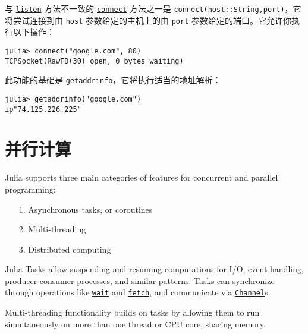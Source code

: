 与 \hyperlink{780704944207038170}{\texttt{listen}} 方法不一致的 \hyperlink{9743233285520657275}{\texttt{connect}} 方法之一是 \texttt{connect(host::String,port)}，它将尝试连接到由 \texttt{host} 参数给定的主机上的由 \texttt{port} 参数给定的端口。它允许你执行以下操作：




\begin{verbatim}
julia> connect("google.com", 80)
TCPSocket(RawFD(30) open, 0 bytes waiting)
\end{verbatim}



此功能的基础是 \hyperlink{10301989504197190983}{\texttt{getaddrinfo}}，它将执行适当的地址解析：




\begin{verbatim}
julia> getaddrinfo("google.com")
ip"74.125.226.225"
\end{verbatim}



\hypertarget{6184253979084926}{}


\chapter{并行计算}



Julia supports three main categories of features for concurrent and parallel programming:



\begin{itemize}
\item[1. ] Asynchronous {\textquotedbl}tasks{\textquotedbl}, or coroutines


\item[2. ] Multi-threading


\item[3. ] Distributed computing

\end{itemize}


Julia Tasks allow suspending and resuming computations for I/O, event handling, producer-consumer processes, and similar patterns. Tasks can synchronize through operations like \hyperlink{13761789780433862250}{\texttt{wait}} and \hyperlink{11007884648860062495}{\texttt{fetch}}, and communicate via \hyperlink{12548845729684045604}{\texttt{Channel}}s.



Multi-threading functionality builds on tasks by allowing them to run simultaneously on more than one thread or CPU core, sharing memory.



